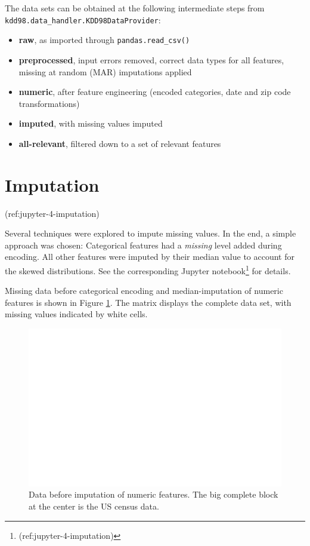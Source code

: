 \documentclass[
  11pt,
  a4paper,
  DIV=12,captions=tableheading,oneside,titlepage=firstiscover,abstracton]{scrreprt}
\providecommand{\tightlist}{%
  \setlength{\itemsep}{0pt}\setlength{\parskip}{0pt}}
\providecommand{\tightlist}{%
  \setlength{\itemsep}{0pt}\setlength{\parskip}{0pt}}
\begin{document}
The data sets can be obtained at the following intermediate steps from \texttt{kdd98.data\_handler.KDD98DataProvider}:

\begin{itemize}
\tightlist
\item
  \textbf{raw}, as imported through \texttt{pandas.read\_csv()}
\item
  \textbf{preprocessed}, input errors removed, correct data types for all features, missing at random (MAR) imputations applied
\item
  \textbf{numeric}, after feature engineering (encoded categories, date and zip code transformations)
\item
  \textbf{imputed}, with missing values imputed
\item
  \textbf{all-relevant}, filtered down to a set of relevant features
\end{itemize}

\hypertarget{imputation-1}{%
\section{Imputation}\label{imputation-1}}

(ref:jupyter-4-imputation)

Several techniques were explored to impute missing values. In the end, a simple approach was chosen: Categorical features had a \emph{missing} level added during encoding. All other features were imputed by their median value to account for the skewed distributions. See the corresponding Jupyter notebook\footnote{(ref:jupyter-4-imputation)} for details.

Missing data before categorical encoding and median-imputation of numeric features is shown in Figure \ref{fig:before-impute}. The matrix displays the complete data set, with missing values indicated by white cells.



\begin{figure}

{\centering \includegraphics[width=0.6\linewidth]{figures/imputation/missing-matrix} 

}

\caption{Data before imputation of numeric features. The big complete block at the center is the US census data. }\label{fig:before-impute}
\end{figure}
\end{document}
